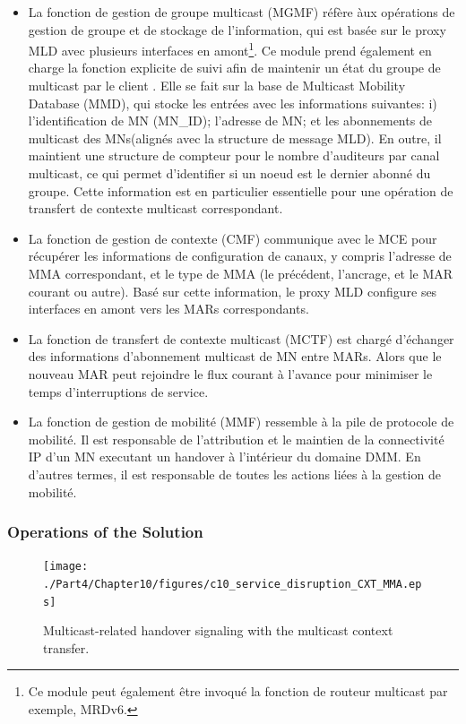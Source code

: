 \begin{itemize}
\item La fonction de gestion de groupe multicast (MGMF) réfère àux opérations de gestion de groupe et de stockage de l'information, qui est basée sur le proxy MLD avec plusieurs interfaces en amont\footnote{Ce module peut également être invoqué la fonction de routeur multicast par exemple, MRDv6.}. Ce module prend également en charge la fonction explicite de suivi afin de maintenir un état ​​du groupe de multicast par le client \cite{explicit_tracking}. Elle se fait sur ​​la base de Multicast Mobility Database (MMD), qui stocke les entrées avec les informations suivantes: i) l'identification de MN (MN\_ID); l'adresse de MN; et les abonnements de multicast des MNs(alignés avec la structure de message MLD). En outre, il maintient une structure de compteur pour le nombre d'auditeurs par canal multicast, ce qui permet d'identifier si un noeud est le dernier abonné du groupe. Cette information est en particulier essentielle pour une opération de transfert de contexte multicast correspondant.

\item La fonction de gestion de contexte (CMF) communique avec le MCE pour récupérer les informations de configuration de canaux, y compris l'adresse de MMA correspondant, et le type de MMA (le précédent, l'ancrage, et le MAR courant ou autre). Basé sur cette information, le proxy MLD configure ses interfaces en amont vers les MARs correspondants.

\item La fonction de transfert de contexte multicast (MCTF) est chargé d'échanger des informations d'abonnement multicast de MN entre MARs. Alors que le nouveau MAR peut rejoindre le flux courant à l'avance pour minimiser le temps d'interruptions de service.

\item La fonction de gestion de mobilité (MMF) ressemble à la pile de protocole de mobilité. Il est responsable de l'attribution et le maintien de la connectivité IP d'un MN executant un handover à l'intérieur du domaine DMM. En d'autres termes, il est responsable de toutes les actions liées à la gestion de mobilité.

\end{itemize}
\subsubsection{Operations of the Solution}
\begin{figure}[tb!] 
  \begin{center} 
    \texttt{[image: ./Part4/Chapter10/figures/c10\_service\_disruption\_CXT\_MMA.eps]} 
    \caption{Multicast-related handover signaling with the multicast context transfer.}
    \label{fig:c10_handover_signaling}
  \end{center} 
\end{figure}

